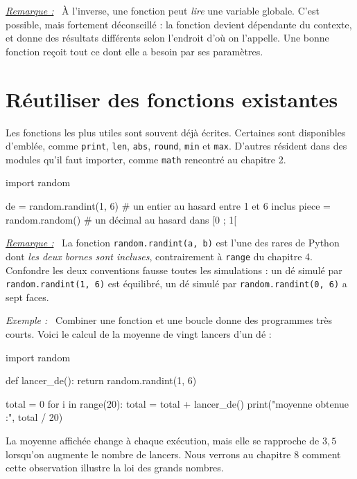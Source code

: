 \documentclass[a4paper,11pt,openany]{book}
\newcommand{\code}[1]{\texttt{\textcolor{codebleu}{#1}}}
\newenvironment{exemple}%
 {\par\vspace{1mm}\begin{list}{}{\leftmargin=1cm \rightmargin=0.5cm}\item[]%
  \textit{Exemple :}~}%
 {\end{list}\vspace{1mm}}
\newenvironment{remarque}%
 {\par\vspace{1mm}\begin{list}{}{\leftmargin=1cm \rightmargin=0.5cm}\item[]%
  \textit{\underline{Remarque :}}~}%
 {\end{list}\vspace{1mm}}
\begin{document}
\begin{remarque}
À l'inverse, une fonction peut \emph{lire} une variable globale. C'est possible, mais fortement déconseillé : la fonction devient dépendante du contexte, et donne des résultats différents selon l'endroit d'où on l'appelle. Une bonne fonction reçoit tout ce dont elle a besoin par ses paramètres.
\end{remarque}

\section{Réutiliser des fonctions existantes}

Les fonctions les plus utiles sont souvent déjà écrites. Certaines sont disponibles d'emblée, comme \code{print}, \code{len}, \code{abs}, \code{round}, \code{min} et \code{max}. D'autres résident dans des modules qu'il faut importer, comme \code{math} rencontré au chapitre 2.

\begin{python}
import random

de = random.randint(1, 6)       # un entier au hasard entre 1 et 6 inclus
piece = random.random()         # un décimal au hasard dans [0 ; 1[
\end{python}

\begin{remarque}
La fonction \code{random.randint(a, b)} est l'une des rares de Python dont \emph{les deux bornes sont incluses}, contrairement à \code{range} du chapitre 4. Confondre les deux conventions fausse toutes les simulations : un dé simulé par \code{random.randint(1, 6)} est équilibré, un dé simulé par \code{random.randint(0, 6)} a sept faces.
\end{remarque}

\begin{exemple}
Combiner une fonction et une boucle donne des programmes très courts. Voici le calcul de la moyenne de vingt lancers d'un dé :
\begin{python}
import random

def lancer_de():
    return random.randint(1, 6)

total = 0
for i in range(20):
    total = total + lancer_de()
print("moyenne obtenue :", total / 20)
\end{python}
La moyenne affichée change à chaque exécution, mais elle se rapproche de $3{,}5$ lorsqu'on augmente le nombre de lancers. Nous verrons au chapitre 8 comment cette observation illustre la loi des grands nombres.
\end{exemple}
\end{document}
